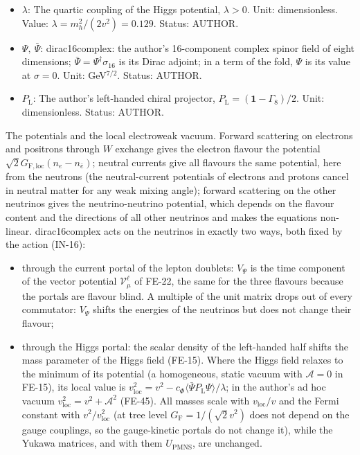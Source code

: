 \documentclass[
  10pt,
]{article}
\providecommand{\tightlist}{%
  \setlength{\itemsep}{0pt}\setlength{\parskip}{0pt}}
\begin{document}
\begin{itemize}
  \(c_\Phi\): The Higgs-portal coupling of the left-handed half of
  dirac16complex (the right-handed half has none). Unit: GeV\(^{-5}\).
  Status: INVENTED.
\item
  \(\lambda\): The quartic coupling of the Higgs potential,
  \(\lambda > 0\). Unit: dimensionless. Value:
  \(\lambda = m_h^2/(2v^2) = 0.129\). Status: AUTHOR.
\item
  \(\Psi,\ \bar\Psi\): dirac16complex: the author's 16-component complex
  spinor field of eight dimensions;
  \(\bar\Psi = \Psi^\dagger\sigma_{16}\) is its Dirac adjoint; in a term
  of the fold, \(\Psi\) is its value at \(\sigma = 0\). Unit:
  GeV\(^{7/2}\). Status: AUTHOR.
\item
  \(P_{\mathrm{L}}\): The author's left-handed chiral projector,
  \(P_{\mathrm{L}} = (\mathbf{1} - \Gamma_8)/2\). Unit: dimensionless.
  Status: AUTHOR.
\end{itemize}

The potentials and the local electroweak vacuum. Forward scattering on
electrons and positrons through \(W\) exchange gives the electron
flavour the potential \(\sqrt2G_{\mathrm{F,loc}}(n_e - n_{\bar e})\);
neutral currents give all flavours the same potential, here from the
neutrons (the neutral-current potentials of electrons and protons cancel
in neutral matter for any weak mixing angle); forward scattering on the
other neutrinos gives the neutrino-neutrino potential, which depends on
the flavour content and the directions of all other neutrinos and makes
the equations non-linear. dirac16complex acts on the neutrinos in
exactly two ways, both fixed by the action (IN-16):

\begin{itemize}
\tightlist
\item
  through the current portal of the lepton doublets: \(V_\Psi\) is the
  time component of the vector potential \(\mathcal{V}^{\ell}_\mu\) of
  FE-22, the same for the three flavours because the portals are flavour
  blind. A multiple of the unit matrix drops out of every commutator:
  \(V_\Psi\) shifts the energies of the neutrinos but does not change
  their flavour;
\item
  through the Higgs portal: the scalar density of the left-handed half
  shifts the mass parameter of the Higgs field (FE-15). Where the Higgs
  field relaxes to the minimum of its potential (a homogeneous, static
  vacuum with \(\mathcal{A} = 0\) in FE-15), its local value is
  \(v_{\mathrm{loc}}^2 = v^2 - c_\Phi\langle\bar\Psi P_{\mathrm{L}}\Psi\rangle/\lambda\);
  in the author's ad hoc vacuum
  \(v_{\mathrm{loc}}^2 = v^2 + \mathcal{A}^2\) (FE-45). All masses scale
  with \(v_{\mathrm{loc}}/v\) and the Fermi constant with
  \(v^2/v_{\mathrm{loc}}^2\) (at tree level
  \(G_{\mathrm{F}} = 1/(\sqrt2 v^2)\) does not depend on the gauge
  couplings, so the gauge-kinetic portals do not change it), while the
  Yukawa matrices, and with them \(U_{\mathrm{PMNS}}\), are unchanged.
\end{itemize}
\end{document}
